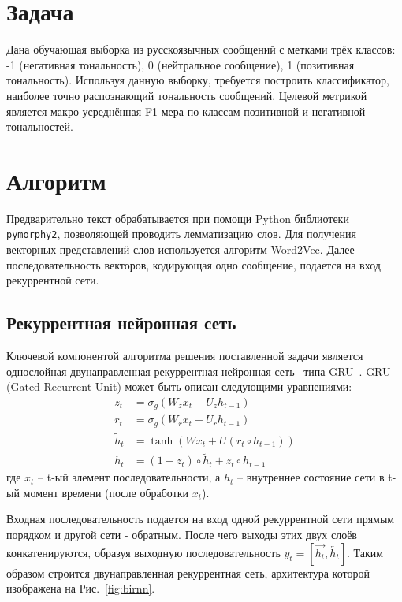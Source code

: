\documentclass[12pt]{article}
\newcommand{\ENGLISH}[1]{#1}
\begin{document}
\section{Задача}
Дана обучающая выборка из русскоязычных сообщений с метками трёх классов: -1 (негативная тональность), 0 (нейтральное сообщение), 1 (позитивная тональность). Используя данную выборку, требуется построить классификатор, наиболее точно распознающий тональность сообщений. Целевой метрикой является макро-усреднённая F1-мера по классам позитивной и негативной тональностей.

\section{Алгоритм}
Предварительно текст обрабатывается при помощи Python библиотеки \ENGLISH{\texttt{pymorphy2}}, позволяющей проводить лемматизацию слов. Для получения векторных представлений слов используется алгоритм Word2Vec. Далее последовательность векторов, кодирующая одно сообщение, подается на вход рекуррентной сети.

\subsection{Рекуррентная нейронная сеть}
Ключевой компонентой алгоритма решения поставленной задачи является однослойная двунаправленная рекуррентная нейронная сеть~\cite{schuster} типа GRU~\cite{cho}. GRU (Gated Recurrent Unit) может быть описан следующими уравнениями:
	\begin{align}
	z_{t}&=\sigma_{g}(W_{z}x_{t}+U_{z}h_{t-1})\\
	r_{t}&=\sigma_{g}(W_{r}x_{t}+U_{r}h_{t-1})\\
	\tilde{h}_{t}&=\tanh(Wx_{t}+U(r_{t}\circ h_{t-1}))\\
	h_{t}&=(1-z_{t})\circ \tilde{h}_{t}+z_{t}\circ h_{t-1}
	\end{align}	
где $x_{t}$ -- t-ый элемент последовательности, а $h_{t}$ -- внутреннее состояние сети в t-ый момент времени (после обработки $x_{t}$).

Входная последовательность подается на вход одной рекуррентной сети прямым порядком и другой сети - обратным. После чего выходы этих двух слоёв конкатенируются, образуя выходную последовательность $y_{t} = \left[\overrightarrow{h_{t}},\overleftarrow{h_{t}}\right]$. Таким образом строится двунаправленная рекуррентная сеть, архитектура которой изображена на Рис.~\ref{fig:birnn}.
\end{document}
